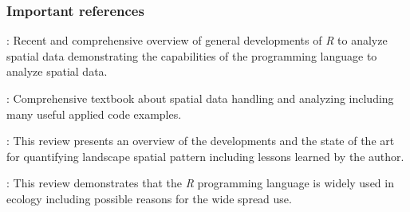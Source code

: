 \documentclass[smallextended]{svjour3}       %
\begin{document}
\hypertarget{important-references}{%
\subsubsection{Important references}\label{important-references}}

\noindent \textbullet \textbullet \cite{Bivand2020}: Recent and comprehensive overview of general developments of \textit{R} to analyze spatial data demonstrating the capabilities of the programming language to analyze spatial data.

\noindent \textbullet \textbullet \cite{Lovelace2019}: Comprehensive textbook about spatial data handling and analyzing including many useful applied code examples.

\noindent \textbullet \cite{Gustafson2019}: This review presents an overview of the developments and the state of the art for quantifying landscape spatial pattern including lessons learned by the author.

\noindent \textbullet \cite{Lai2019}: This review demonstrates that the \textit{R} programming language is widely used in ecology including possible reasons for the wide spread use.




\end{document}
